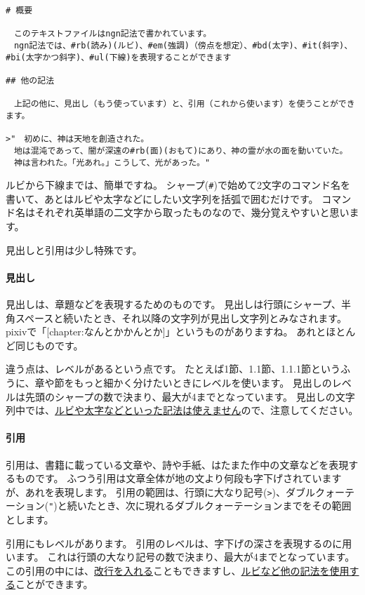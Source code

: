 \documentclass[a4j]{jsarticle}
\begin{document}
\begin{lstlisting}[caption=ngn記法]
# 概要

　このテキストファイルはngn記法で書かれています。
　ngn記法では、#rb(読み)(ルビ)、#em(強調)（傍点を想定）、#bd(太字)、#it(斜字)、#bi(太字かつ斜字)、#ul(下線)を表現することができます

## 他の記法

　上記の他に、見出し（もう使っています）と、引用（これから使います）を使うことができます。

>"　初めに、神は天地を創造された。
　地は混沌であって、闇が深遠の#rb(面)(おもて)にあり、神の霊が水の面を動いていた。
　神は言われた。「光あれ。」こうして、光があった。"

\end{lstlisting}

ルビから下線までは、簡単ですね。
シャープ(\verb|#|)で始めて2文字のコマンド名を書いて、あとはルビや太字などにしたい文字列を括弧で囲むだけです。
コマンド名はそれぞれ英単語の二文字から取ったものなので、幾分覚えやすいと思います。

見出しと引用は少し特殊です。

\paragraph{見出し}

見出しは、章題などを表現するためのものです。
見出しは行頭にシャープ、半角スペースと続いたとき、それ以降の文字列が見出し文字列とみなされます。
pixivで「[chapter:なんとかかんとか]」というものがありますね。
あれとほとんど同じものです。

違う点は、レベルがあるという点です。
たとえば1節、1.1節、1.1.1節というふうに、章や節をもっと細かく分けたいときにレベルを使います。
見出しのレベルは先頭のシャープの数で決まり、最大が4までとなっています。
見出しの文字列中では、\underline{ルビや太字などといった記法は使えません}ので、注意してください。

\paragraph{引用}

引用は、書籍に載っている文章や、詩や手紙、はたまた作中の文章などを表現するものです。
ふつう引用は文章全体が地の文より何段も字下げされていますが、あれを表現します。
引用の範囲は、行頭に大なり記号(\verb|>|)、ダブルクォーテーション(\verb|"|)と続いたとき、次に現れるダブルクォーテーションまでをその範囲とします。

引用にもレベルがあります。
引用のレベルは、字下げの深さを表現するのに用います。
これは行頭の大なり記号の数で決まり、最大が4までとなっています。
この引用の中には、\underline{改行を入れる}こともできますし、\underline{ルビなど他の記法を使用する}ことができます。
\end{document}
